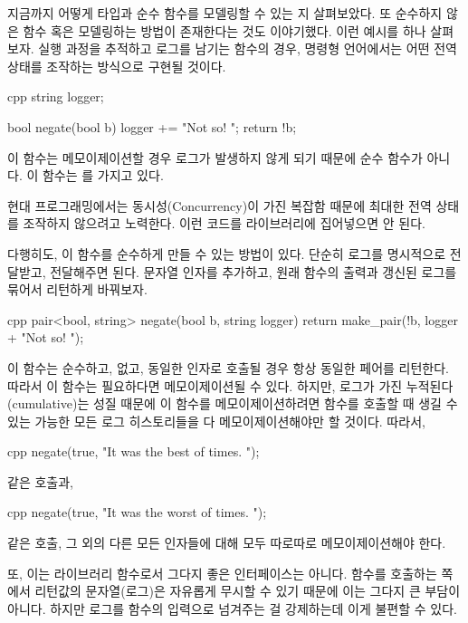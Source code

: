 
\lettrine[lhang=0.17]{지}{금까지} 어떻게 타입과 순수 함수를  모델링할 수 있는 지 살펴보았다.
또  순수하지 않은 함수 혹은  모델링하는 방법이 존재한다는 것도 이야기했다.
이런 예시를 하나 살펴보자. 실행 과정을 추적하고 로그를 남기는 함수의 경우, 명령형 언어에서는 어떤 전역 상태를 조작하는 방식으로 구현될 것이다.

\begin{snip}{cpp}
string logger;

bool negate(bool b) {
    logger += "Not so! ";
    return !b;
}
\end{snip}
이 함수는 메모이제이션할 경우 로그가 발생하지 않게 되기 때문에 순수 함수가 아니다. 이 함수는 \newterm{\trSideEffect}를 가지고 있다.

현대 프로그래밍에서는 동시성(Concurrency)이 가진 복잡함 때문에 최대한 전역 상태를 조작하지 않으려고 노력한다. 이런 코드를 라이브러리에 집어넣으면 안 된다.

다행히도, 이 함수를 순수하게 만들 수 있는 방법이 있다. 단순히 로그를 명시적으로 전달받고, 전달해주면 된다. 문자열 인자를 추가하고, 원래 함수의 출력과 갱신된 로그를 묶어서 리턴하게 바꿔보자.

\begin{snip}{cpp}
pair<bool, string> negate(bool b, string logger) {
    return make_pair(!b, logger + "Not so! ");
}
\end{snip}
이 함수는 순수하고,  없고, 동일한 인자로 호출될 경우 항상 동일한 페어를 리턴한다. 따라서 이 함수는 필요하다면 메모이제이션될 수 있다.
하지만, 로그가 가진 누적된다(cumulative)는 성질 때문에 이 함수를 메모이제이션하려면 함수를 호출할 때 생길 수 있는 가능한 모든 로그 히스토리들을 다 메모이제이션해야만 할 것이다.
따라서,

\begin{snip}{cpp}
negate(true, "It was the best of times. ");
\end{snip}
같은 호출과,

\begin{snip}{cpp}
negate(true, "It was the worst of times. ");
\end{snip}
같은 호출, 그 외의 다른 모든 인자들에 대해 모두 따로따로 메모이제이션해야 한다.

또, 이는 라이브러리 함수로서 그다지 좋은 인터페이스는 아니다. 함수를 호출하는 쪽에서 리턴값의 문자열(로그)은 자유롭게 무시할 수 있기 때문에 이는 그다지 큰 부담이 아니다.
하지만 로그를 함수의 입력으로 넘겨주는 걸 강제하는데 이게 불편할 수 있다.

